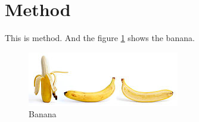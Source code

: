 \section{Method}
\label{sec:method}

This is method. And the figure \ref{fig:banana} shows the banana.

\begin{figure}
    \includegraphics[width=0.75\linewidth, center]{figures/banana.jpg}
    \caption{Banana}
    \label{fig:banana}
\end{figure}
